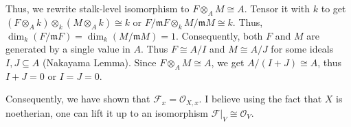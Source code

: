 \documentclass{template}
\begin{document}
Thus, we rewrite stalk-level isomorphism to $F \otimes_A M \cong A$. Tensor
it with $k$ to get $(F \otimes_A k) \otimes_k (M \otimes_A k) \cong k$
or $F/\mathfrak{m}F \otimes_k M/\mathfrak{m}M \cong k$. Thus, 
$\dim_k(F/\mathfrak{m}F) = \dim_k(M/\mathfrak{m}M) = 1$.
Consequently, both $F$ and $M$ are generated by a single value in $A$.
Thus $F \cong A/I$ and $M \cong A/J$ for some ideals $I,J \subseteq A$
(Nakayama Lemma). Since $F \otimes_A M \cong A$, we get $A/(I+J) \cong A$,
thus $I+J=0$ or $I=J=0$.

Consequently, we have shown that $\mathcal{F}_x = \mathcal{O}_{X,x}$.
I believe using the fact that $X$ is noetherian, one can lift it up to 
an isomorphism $\mathcal{F}|_V \cong \mathcal{O}_V$.

\nocite{*}
\renewcommand{\refname}{}


\end{document}
